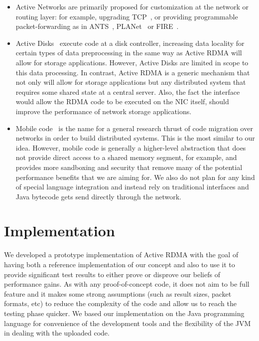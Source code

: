 \documentclass[10pt]{article}
\begin{document}
\begin{itemize} \itemsep -2pt

\item Active Networks are primarily proposed for customization at the
  network or routing layer: for example, upgrading TCP~\cite{AN-tcp},
  or providing programmable packet-forwarding as in ANTS~\cite{ANTS},
  PLANet~\cite{planet} or FIRE~\cite{FIRE}.

\item Active Disks~\cite{AD2,AD} execute code at a disk controller,
  increasing data locality for certain types of data preprocessing in
  the same way as Active RDMA will allow for storage applications.
  However, Active Disks are limited in scope to this data processing.
  In contrast, Active RDMA is a generic mechanism that not only will
  allow for storage applications but any distributed system that
  requires some shared state at a central server. Also, the fact the
  interface would allow the RDMA code to be executed on the NIC itself, 
  should improve the performance of network storage applications.

\item Mobile code~\cite{mobile} is the name for a general research
  thrust of code migration over networks in order to build distributed
  systems. This is the most similar to our idea. However, mobile
  code is generally a higher-level abstraction that does not provide
  direct access to a shared memory segment, for example, and provides
  more sandboxing and security that remove many of the potential
  performance benefits that we are aiming for. We also do not plan for any kind of special language integration and instead rely on traditional interfaces and Java bytecode gets send directly through the network.

\end{itemize}

\section{Implementation}


We developed a prototype implementation of Active RDMA with the goal of having both a reference implementation of our concept and also to use it to provide significant test results to either prove or disprove our beliefs of performance gains. As with any proof-of-concept code, it does not aim to be full feature and it makes some strong assumptions (such as result sizes, packet formats, etc) to reduce the complexity of the code and allow us to reach the testing phase quicker. We based our implementation on the Java programming language for convenience of the development tools and the flexibility of the JVM in dealing with the uploaded code.
\end{document}

